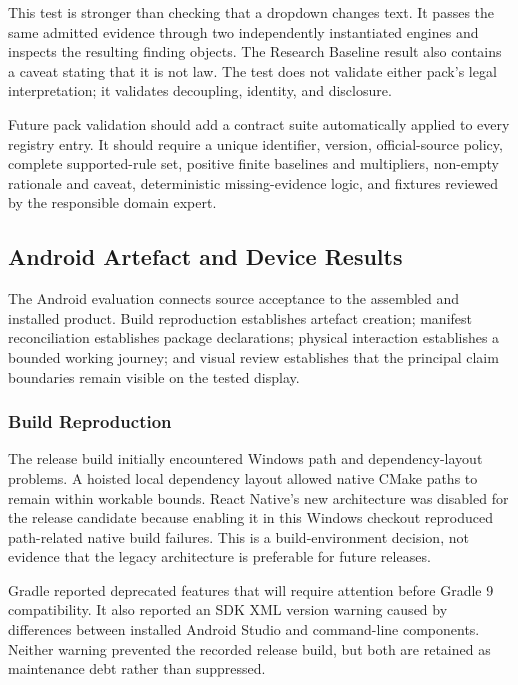 This test is stronger than checking that a dropdown changes text. It passes the same admitted evidence through two independently instantiated engines and inspects the resulting finding objects. The Research Baseline result also contains a caveat stating that it is not law. The test does not validate either pack's legal interpretation; it validates decoupling, identity, and disclosure.

Future pack validation should add a contract suite automatically applied to every registry entry. It should require a unique identifier, version, official-source policy, complete supported-rule set, positive finite baselines and multipliers, non-empty rationale and caveat, deterministic missing-evidence logic, and fixtures reviewed by the responsible domain expert.

\subsection{Android Artefact and Device Results}

The Android evaluation connects source acceptance to the assembled and installed product. Build reproduction establishes artefact creation; manifest reconciliation establishes package declarations; physical interaction establishes a bounded working journey; and visual review establishes that the principal claim boundaries remain visible on the tested display.

\subsubsection{Build Reproduction}

The release build initially encountered Windows path and dependency-layout problems. A hoisted local dependency layout allowed native CMake paths to remain within workable bounds. React Native's new architecture was disabled for the release candidate because enabling it in this Windows checkout reproduced path-related native build failures. This is a build-environment decision, not evidence that the legacy architecture is preferable for future releases.

Gradle reported deprecated features that will require attention before Gradle 9 compatibility. It also reported an SDK XML version warning caused by differences between installed Android Studio and command-line components. Neither warning prevented the recorded release build, but both are retained as maintenance debt rather than suppressed.

